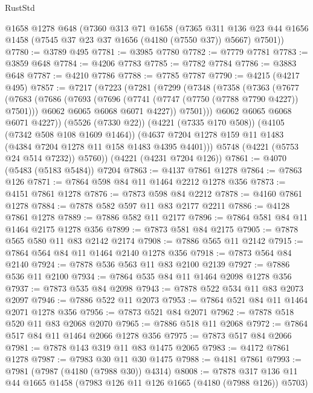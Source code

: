 \begin{lexlean}{RustStd}
\begin{coremodule}
    @1658
    @1278
    @648
    (@7360
      @313
      @71
      @1658
      (@7365
        @311
        @136
        @23
        @44
        @1656
        @1458
        (@7545 @37 @23 @37 @1656 (@4180 (@7550 @37)) @5667)
        @7501))
@7780 := @3789 @495
@7781 := @3985 @7780
@7782 := @7779 @7781
@7783 := @3859 @648
@7784 := @4206 @7783
@7785 := @7782 @7784
@7786 := @3883 @648
@7787 := @4210 @7786
@7788 := @7785 @7787
@7790 := @4215 (@4217 @495)
@7857 := @7217
    (@7223
      (@7281
        (@7299
          (@7348
            (@7358
              (@7363
                (@7677
                  (@7683
                    (@7686
                      (@7693
                        (@7696 (@7741 (@7747 (@7750 (@7788 @7790 @4227)) @7501)))
                        @6062
                        @6065
                        @6068
                        @6071
                        @4227))
                    @7501)))
              @6062
              @6065
              @6068
              @6071
              @4227))
          (@5526 (@7330 @22))
          (@4221 (@7335 @170 @508))
          (@4105 (@7342 @508 @108 @1609 @1464))
          (@4637 @7204 @1278 @159 @11 @1483 (@4384 @7204 @1278 @11 @158 @1483 @4395 @4401)))
        @5748
        (@4221 (@5753 @24 @514 @7232))
        @5760))
    (@4221 (@4231 @7204 @126))
@7861 := @4070 (@5483 (@5183 @5484)) @7204
@7863 := @4137 @7861 @1278
@7864 := @7863 @126
@7871 := @7864 @598 @84 @11 @1464 @2212 @1278 @356
@7873 := @4151 @7861 @1278
@7876 := @7873 @598 @84 @2212
@7878 := @4160 @7861 @1278
@7884 := @7878 @582 @597 @11 @83 @2177 @2211
@7886 := @4128 @7861 @1278
@7889 := @7886 @582 @11 @2177
@7896 := @7864 @581 @84 @11 @1464 @2175 @1278 @356
@7899 := @7873 @581 @84 @2175
@7905 := @7878 @565 @580 @11 @83 @2142 @2174
@7908 := @7886 @565 @11 @2142
@7915 := @7864 @564 @84 @11 @1464 @2140 @1278 @356
@7918 := @7873 @564 @84 @2140
@7924 := @7878 @536 @563 @11 @83 @2100 @2139
@7927 := @7886 @536 @11 @2100
@7934 := @7864 @535 @84 @11 @1464 @2098 @1278 @356
@7937 := @7873 @535 @84 @2098
@7943 := @7878 @522 @534 @11 @83 @2073 @2097
@7946 := @7886 @522 @11 @2073
@7953 := @7864 @521 @84 @11 @1464 @2071 @1278 @356
@7956 := @7873 @521 @84 @2071
@7962 := @7878 @518 @520 @11 @83 @2068 @2070
@7965 := @7886 @518 @11 @2068
@7972 := @7864 @517 @84 @11 @1464 @2066 @1278 @356
@7975 := @7873 @517 @84 @2066
@7981 := @7878 @143 @319 @11 @83 @1475 @2065
@7983 := @4172 @7861 @1278
@7987 := @7983 @30 @11 @30 @1475
@7988 := @4181 @7861
@7993 := @7981 (@7987 (@4180 (@7988 @30)) @4314)
@8008 := @7878 @317 @136 @11 @44 @1665 @1458 (@7983 @126 @11 @126 @1665 (@4180 (@7988 @126)) @5703)

\end{coremodule}
\end{lexlean}
